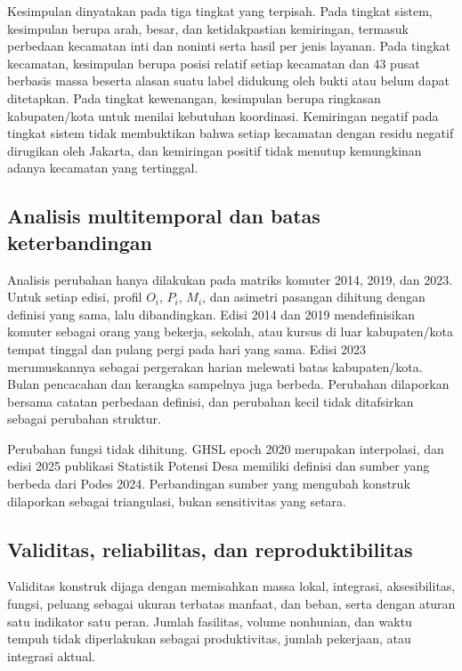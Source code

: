 \documentclass[12pt,a4paper,oneside,openany,indonesian]{report}
\begin{document}
Kesimpulan dinyatakan pada tiga tingkat yang terpisah. Pada tingkat
sistem, kesimpulan berupa arah, besar, dan ketidakpastian kemiringan,
termasuk perbedaan kecamatan inti dan noninti serta hasil per jenis
layanan. Pada tingkat kecamatan, kesimpulan berupa posisi relatif setiap
kecamatan dan 43 pusat berbasis massa beserta alasan suatu label
didukung oleh bukti atau belum dapat ditetapkan. Pada tingkat kewenangan,
kesimpulan berupa ringkasan kabupaten/kota untuk menilai kebutuhan
koordinasi. Kemiringan
negatif pada tingkat sistem tidak membuktikan bahwa setiap kecamatan
dengan residu negatif dirugikan oleh Jakarta, dan kemiringan positif
tidak menutup kemungkinan adanya kecamatan yang tertinggal.

\subsection{Analisis multitemporal dan batas
keterbandingan}\label{analisis-multitemporal-dan-batas-keterbandingan}

Analisis perubahan hanya dilakukan pada matriks komuter 2014, 2019, dan
2023. Untuk setiap edisi, profil $O_i$, $P_i$, $M_i$, dan asimetri
pasangan dihitung dengan definisi yang sama, lalu dibandingkan. Edisi
2014 dan 2019 mendefinisikan komuter sebagai orang yang bekerja,
sekolah, atau kursus di luar kabupaten/kota tempat tinggal dan pulang
pergi pada hari yang sama. Edisi 2023 merumuskannya sebagai pergerakan
harian melewati batas kabupaten/kota. Bulan pencacahan dan kerangka
sampelnya juga berbeda. Perubahan dilaporkan bersama catatan
perbedaan definisi, dan perubahan kecil tidak ditafsirkan sebagai
perubahan struktur.

Perubahan fungsi tidak dihitung. GHSL epoch 2020 merupakan interpolasi,
dan edisi 2025 publikasi Statistik Potensi Desa memiliki definisi dan
sumber yang berbeda dari Podes 2024. Perbandingan sumber yang mengubah
konstruk dilaporkan sebagai triangulasi, bukan sensitivitas yang
setara.

\subsection{Validitas, reliabilitas, dan
reproduktibilitas}\label{validitas-reliabilitas-dan-reproduktibilitas}

Validitas konstruk dijaga dengan memisahkan massa lokal, integrasi,
aksesibilitas, fungsi, peluang sebagai ukuran terbatas manfaat, dan beban,
serta dengan aturan satu
indikator satu peran. Jumlah fasilitas, volume nonhunian, dan waktu
tempuh tidak diperlakukan sebagai produktivitas, jumlah pekerjaan, atau
integrasi aktual.
\end{document}
